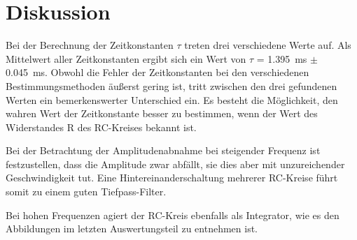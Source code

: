 
\section{Diskussion}
Bei der Berechnung der Zeitkonstanten $\tau$ treten drei verschiedene Werte auf. Als Mittelwert aller Zeitkonstanten ergibt sich ein Wert von $\tau$ = \SI{1.395}{\milli\second} $\pm$ \SI{0.045}{\milli\second}. Obwohl die Fehler der Zeitkonstanten bei den verschiedenen Bestimmungsmethoden äußerst gering ist, tritt zwischen den drei gefundenen Werten ein bemerkenswerter Unterschied ein. Es besteht die Möglichkeit, den wahren Wert der Zeitkonstante besser zu bestimmen, wenn der Wert des Widerstandes R des RC-Kreises bekannt ist.

Bei der Betrachtung der Amplitudenabnahme bei steigender Frequenz ist festzustellen, dass die Amplitude zwar abfällt, sie dies aber mit unzureichender Geschwindigkeit tut. Eine Hintereinanderschaltung mehrerer RC-Kreise führt somit zu einem guten Tiefpass-Filter. 

Bei hohen Frequenzen agiert der RC-Kreis ebenfalls als Integrator, wie es den Abbildungen im letzten Auswertungsteil zu entnehmen ist.